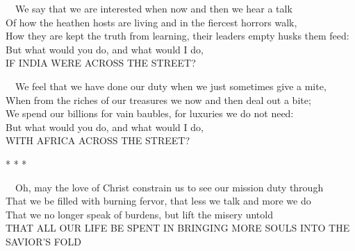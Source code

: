 \documentclass[
]{book}
\begin{document}
~~We say that we are interested when now and then we hear a talk\\
\hspace*{0.333em}\hspace*{0.333em}Of how the heathen hosts are living and in the fiercest horrors walk,\\
\hspace*{0.333em}\hspace*{0.333em}How they are kept the truth from learning, their leaders empty husks them feed:\\
\hspace*{0.333em}\hspace*{0.333em}But what would you do, and what would I do,\\
\hspace*{0.333em}\hspace*{0.333em}IF INDIA WERE ACROSS THE STREET?

~~We feel that we have done our duty when we just sometimes give a mite,\\
\hspace*{0.333em}\hspace*{0.333em}When from the riches of our treasures we now and then deal out a bite;\\
\hspace*{0.333em}\hspace*{0.333em}We spend our billions for vain baubles, for luxuries we do not need:\\
\hspace*{0.333em}\hspace*{0.333em}But what would you do, and what would I do,\\
\hspace*{0.333em}\hspace*{0.333em}WITH AFRICA ACROSS THE STREET?

\begin{center} * * * \end{center}

~~Oh, may the love of Christ constrain us to see our mission duty through\\
\hspace*{0.333em}\hspace*{0.333em}That we be filled with burning fervor, that less we talk and more we do\\
\hspace*{0.333em}\hspace*{0.333em}That we no longer speak of burdens, but lift the misery untold\\
\hspace*{0.333em}\hspace*{0.333em}THAT ALL OUR LIFE BE SPENT IN BRINGING MORE SOULS INTO THE SAVIOR'S FOLD
\end{document}
